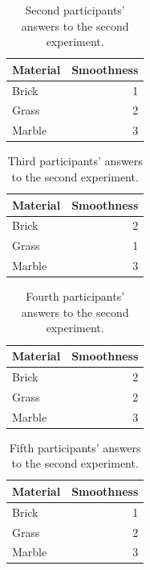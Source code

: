 \documentclass[uplatex,
12pt, %
a4paper,
english, %
oneside,
titlepage,
singlespacing, %
liststotoc, %
headsepline,
]{MastersDoctoralThesis} %
\begin{document}
\begin{appendices}
\begin{table}[H]
  \centering
  \caption{Second participants' answers to the second experiment.}
    \begin{tabular}{|l|r|}
    \toprule
    \textbf{Material} & \multicolumn{1}{l|}{\textbf{Smoothness}} \\
    \midrule
    Brick & 1 \\
    \midrule
    Grass & 2 \\
    \midrule
    Marble & 3 \\
    \bottomrule
    \end{tabular}%
  \label{tab:Ex2_2}%
\end{table}%

\begin{table}[H]
  \centering
  \caption{Third participants' answers to the second experiment.}
    \begin{tabular}{|l|r|}
    \toprule
    \textbf{Material} & \multicolumn{1}{l|}{\textbf{Smoothness}} \\
    \midrule
    Brick & 2 \\
    \midrule
    Grass & 1 \\
    \midrule
    Marble & 3 \\
    \bottomrule
    \end{tabular}%
  \label{tab:Ex2_3}%
\end{table}%

\begin{table}[H]
  \centering
  \caption{Fourth participants' answers to the second experiment.}
    \begin{tabular}{|l|r|}
    \toprule
    \textbf{Material} & \multicolumn{1}{l|}{\textbf{Smoothness}} \\
    \midrule
    Brick & 2 \\
    \midrule
    Grass & 2 \\
    \midrule
    Marble & 3 \\
    \bottomrule
    \end{tabular}%
  \label{tab:Ex2_4}%
\end{table}%

\begin{table}[H]
  \centering
  \caption{Fifth participants' answers to the second experiment.}
    \begin{tabular}{|l|r|}
    \toprule
    \textbf{Material} & \multicolumn{1}{l|}{\textbf{Smoothness}} \\
    \midrule
    Brick & 1 \\
    \midrule
    Grass & 2 \\
    \midrule
    Marble & 3 \\
    \bottomrule
    \end{tabular}%
  \label{tab:Ex2_5}%
\end{table}%


\end{appendices}
\end{document}
